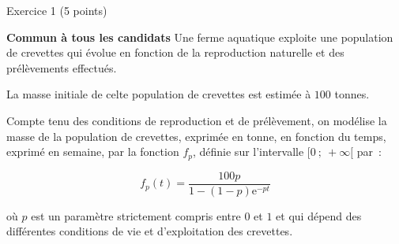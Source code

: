 
\begin{h2}Exercice 1 (5 points)\end{h2}
\textbf{Commun  à tous les candidats}
\bigbreak
Une ferme aquatique exploite une population de crevettes qui évolue en fonction de la reproduction naturelle et des prélèvements effectués.
\par
La masse initiale de celte population de crevettes est estimée à $100$ tonnes.
\par
Compte tenu des conditions de reproduction et de prélèvement, on modélise la masse de la
population de crevettes, exprimée en tonne, en fonction du temps, exprimé en semaine, par la fonction $f_p$, définie sur l'intervalle $[0~;~ +\infty[$ par~:
\par
\[f_p(t) = \dfrac{100p}{1 - (1 - p)\text{e}^{- pt}}\]
\par
où $p$ est un paramètre strictement compris entre $0$ et $1$ et qui dépend des différentes conditions de vie et d'exploitation des crevettes.
\medbreak
